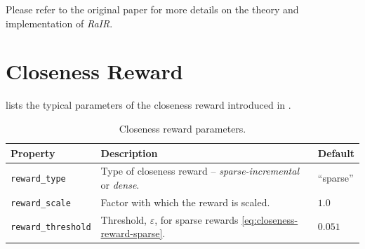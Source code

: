 Please refer to the original paper \citep{rair} for more details on the theory and implementation of \emph{RaIR}.

\section{Closeness Reward}
\label{sec:closeness-reward-details}

 lists the typical parameters of the closeness reward introduced in .
\begin{table}[H]
    \centering
    \caption{Closeness reward parameters.}
    \begin{tabularx}{\textwidth}{C{3.9cm} L C{2.1cm}}
        \hline
        Property & Description & Default\\
        \hline
        \texttt{reward\_type} & Type of closeness reward -- \emph{sparse-incremental} or \emph{dense}. & ``sparse''\\
        \texttt{reward\_scale} & Factor with which the reward is scaled. & \(1.0\)\\
        \texttt{reward\_threshold} & Threshold, \(\varepsilon\), for sparse rewards \eqref{eq:closeness-reward-sparse}. & \(0.051\)\\
        \hline
    \end{tabularx}
    \label{tab:closeness-reward-params}
\end{table}


